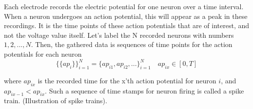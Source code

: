 Each electrode records the electric potential for one neuron over a time interval.  When a neuron undergoes an action potential, this will appear as a peak in these recordings. It is the time points of these action potentials that are of interest, and not the voltage value itself. Let's label the N recorded neurons with numbers $1,2,...,N$. Then, the gathered data is sequences of time points for the action potentials for each neuron
\begin{equation}
    \{\{ap_i\}\}_{i=1}^{N} = \{ap_{i1}, ap_{i2}, ...\}_{i=1}^{N} \quad ap_{ix} \in [0,T]
\end{equation}

where $ap_{ix}$ is the recorded time for the x'th action potential for neuron $i$, and $ap_{ix-1} < ap_{ix}$. Such a sequence of time stamps for neuron firing is called a spike train. (Illustration of spike trains).\\







\cleardoublepage